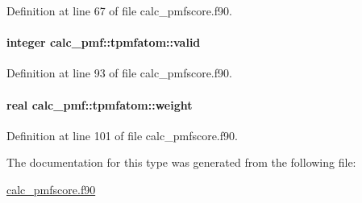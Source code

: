 Definition at line 67 of file calc\-\_\-pmfscore.\-f90.

\hypertarget{structcalc__pmf_1_1tpmfatom_af664ece20811640fdc7f28e778ac18cc}{
\paragraph[{valid}]{\setlength{\rightskip}{0pt plus 5cm}integer calc\-\_\-pmf\-::tpmfatom\-::valid}}\label{structcalc__pmf_1_1tpmfatom_af664ece20811640fdc7f28e778ac18cc}


Definition at line 93 of file calc\-\_\-pmfscore.\-f90.

\hypertarget{structcalc__pmf_1_1tpmfatom_ab27405c362eae2c791b866606a0f77b0}{
\paragraph[{weight}]{\setlength{\rightskip}{0pt plus 5cm}real calc\-\_\-pmf\-::tpmfatom\-::weight}}\label{structcalc__pmf_1_1tpmfatom_ab27405c362eae2c791b866606a0f77b0}


Definition at line 101 of file calc\-\_\-pmfscore.\-f90.



The documentation for this type was generated from the following file\-:\begin{DoxyCompactItemize}
\item 
\hyperlink{calc__pmfscore_8f90}{calc\-\_\-pmfscore.\-f90}\end{DoxyCompactItemize}
